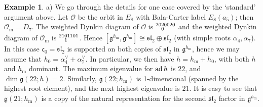 \documentclass{amsart}
\theoremstyle{definition}
\newtheorem{example}[theorem]{Example}
\newcommand{\m}{\mathrm{m}}
\newcommand{\g}{\mathfrak{g}}
\newcommand{\cg}{\mathfrak{c}}
\newcommand{\0}{\mathcal{O}}
\begin{document}
\begin{example}\label{nondomexample}
a) We go through the details for one case covered by the `standard' argument above.
Let $\0$ be the orbit in $E_8$ with Bala-Carter label $E_8(a_5)$; then $\0_\m=D_7$.
The weighted Dynkin diagram of $\0$ is $\scriptsize{\begin{aligned}20 &20020 \\[-1.8mm] &0\end{aligned}}$ and the weighted Dynkin diagram of $\0_\m$ is $\scriptsize{\begin{aligned}21 &01101 \\[-1.8mm] &1\end{aligned}}$.
Hence $[\g^{h_\m},\g^{h_\m}]\cong\mathfrak{sl}_2\oplus\mathfrak{sl}_2$ (with simple roots $\alpha_4,\alpha_7$).
In this case $\cg_0=\mathfrak{sl}_2$ is supported on both copies of $\mathfrak{sl}_2$ in $\g^{h_\m}$, hence we may assume that $h_0=\alpha_4^\vee+\alpha_7^\vee$.
In particular, we then have $h=h_\m+h_0$, with both $h$ and $h_\m$ dominant.
The maximum eigenvalue for ${\rm ad}\, h$ is $22$, and $\dim\g(22;h)=2$.
Similarly, $\g(22;h_\m)$ is 1-dimensional (spanned by the highest root element), and the next highest eigenvalue is $21$.
It is easy to see that $\g(21;h_\m)$ is a copy of the natural representation for the second $\mathfrak{sl}_2$ factor in $\g^{h_\m}$.


\end{example}
\end{document}
